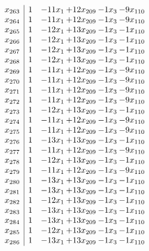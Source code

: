 \documentclass[11pt]{article}
\begin{document}
\[\begin{array}{c| c c@{\hskip 2pt} c@{\hskip 2pt} c@{\hskip 2pt} c@{\hskip 2pt} }
 x_{263}   &  1 & -11 x_{1} & + 12 x_{209} & -1 x_{3} & -9 x_{110}\\
 x_{264}   &  1 & -11 x_{1} & + 12 x_{209} & -1 x_{3} & -9 x_{110}\\
 x_{265}   &  1 & -12 x_{1} & + 13 x_{209} & -1 x_{3} & -1 x_{110}\\
 x_{266}   &  1 & -12 x_{1} & + 13 x_{209} & -1 x_{3} & -1 x_{110}\\
 x_{267}   &  1 & -12 x_{1} & + 13 x_{209} & -1 x_{3} & -1 x_{110}\\
 x_{268}   &  1 & -12 x_{1} & + 13 x_{209} & -1 x_{3} & -1 x_{110}\\
 x_{269}   &  1 & -11 x_{1} & + 12 x_{209} & -1 x_{3} & -9 x_{110}\\
 x_{270}   &  1 & -11 x_{1} & + 12 x_{209} & -1 x_{3} & -9 x_{110}\\
 x_{271}   &  1 & -11 x_{1} & + 12 x_{209} & -1 x_{3} & -9 x_{110}\\
 x_{272}   &  1 & -11 x_{1} & + 12 x_{209} & -1 x_{3} & -9 x_{110}\\
 x_{273}   &  1 & -12 x_{1} & + 13 x_{209} & -1 x_{3} & -1 x_{110}\\
 x_{274}   &  1 & -11 x_{1} & + 12 x_{209} & -1 x_{3} & -9 x_{110}\\
 x_{275}   &  1 & -11 x_{1} & + 12 x_{209} & -1 x_{3} & -9 x_{110}\\
 x_{276}   &  1 & -13 x_{1} & + 13 x_{209} & -1 x_{3} & -1 x_{110}\\
 x_{277}   &  1 & -11 x_{1} & + 12 x_{209} & -1 x_{3} & -9 x_{110}\\
 x_{278}   &  1 & -12 x_{1} & + 13 x_{209} & -1 x_{3} & -1 x_{110}\\
 x_{279}   &  1 & -11 x_{1} & + 12 x_{209} & -1 x_{3} & -9 x_{110}\\
 x_{280}   &  1 & -13 x_{1} & + 13 x_{209} & -1 x_{3} & -1 x_{110}\\
 x_{281}   &  1 & -13 x_{1} & + 13 x_{209} & -1 x_{3} & -1 x_{110}\\
 x_{282}   &  1 & -12 x_{1} & + 13 x_{209} & -1 x_{3} & -1 x_{110}\\
 x_{283}   &  1 & -13 x_{1} & + 13 x_{209} & -1 x_{3} & -1 x_{110}\\
 x_{284}   &  1 & -13 x_{1} & + 13 x_{209} & -1 x_{3} & -1 x_{110}\\
 x_{285}   &  1 & -12 x_{1} & + 13 x_{209} & -1 x_{3} & -1 x_{110}\\
 x_{286}   &  1 & -13 x_{1} & + 13 x_{209} & -1 x_{3} & -1 x_{110}\\

\end{array}\]
\end{document}

